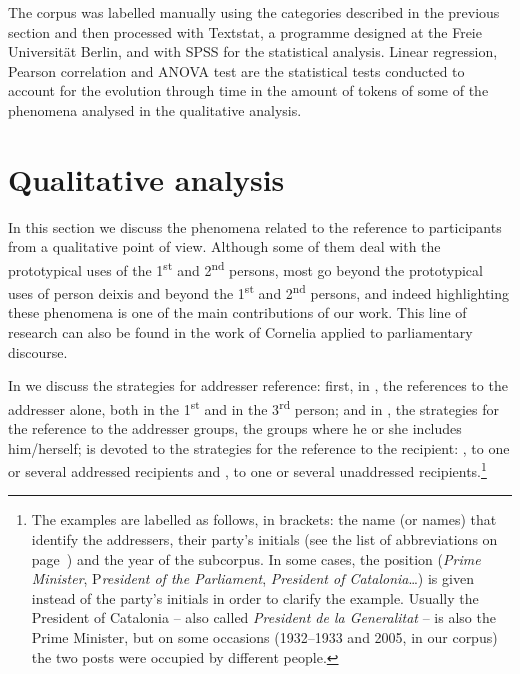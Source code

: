 \documentclass[output=paper]{langscibook}
\begin{document}
The corpus was labelled manually using the categories described in the previous section and then processed with Textstat, a programme designed at the Freie Universität Berlin, and with SPSS for the statistical analysis. Linear regression, Pearson correlation and ANOVA test are the statistical tests conducted to account for the evolution through time in the amount of tokens of some of the phenomena analysed in the qualitative analysis.



\section{Qualitative analysis}\label{sec:nogue:2}


In this section we discuss the phenomena related to the reference to participants from a qualitative point of view. Although some of them deal with the prototypical uses of the 1\textsuperscript{st} and 2\textsuperscript{nd} persons, most go beyond the prototypical uses of person deixis and beyond the 1\textsuperscript{st} and 2\textsuperscript{nd} persons, and indeed highlighting these phenomena is one of the main contributions of our work. This line of research can also be found in the work of Cornelia \citet{Ilie2003, Ilie2010, Ilie2015} applied to parliamentary discourse.



In  we discuss the strategies for addresser reference: first, in , the references to the addresser alone, both in the 1\textsuperscript{st} and in the 3\textsuperscript{rd} person; and in , the strategies for the reference to the addresser groups, the groups where he or she includes him/herself;  is devoted to the strategies for the reference to the recipient: , to one or several addressed recipients and , to one or several unaddressed recipients.\footnote{The examples are labelled as follows, in brackets: the name (or names) that identify the addressers, their party’s initials (see the list of abbreviations on page~\pageref{abbv:NogueSerrano}) and the year of the subcorpus. In some cases, the position (\textit{Prime Minister}, P\textit{resident of the Parliament}, \textit{President of Catalonia}…) is given instead of the party’s initials in order to clarify the example. Usually the President of Catalonia – also called \textit{President de la Generalitat} – is also the Prime Minister, but on some occasions (1932–1933 and 2005, in our corpus) the two posts were occupied by different people.}
\end{document}
